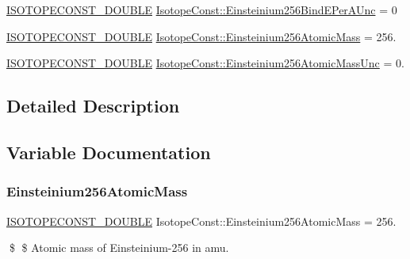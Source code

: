 \begin{DoxyCompactItemize}
\mbox{\hyperlink{group___isotope_const-_macros_ga8f45a7272ce02c0b4c65c44636ed719a}{I\+S\+O\+T\+O\+P\+E\+C\+O\+N\+S\+T\+\_\+\+D\+O\+U\+B\+LE}} \mbox{\hyperlink{group___isotope_const-_einsteinium-_es256_ga9c8a0cc8111fc54d2b53674bae4335a8}{Isotope\+Const\+::\+Einsteinium256\+Bind\+E\+Per\+A\+Unc}} = 0
\item 
\mbox{\hyperlink{group___isotope_const-_macros_ga8f45a7272ce02c0b4c65c44636ed719a}{I\+S\+O\+T\+O\+P\+E\+C\+O\+N\+S\+T\+\_\+\+D\+O\+U\+B\+LE}} \mbox{\hyperlink{group___isotope_const-_einsteinium-_es256_ga25fb31c163e2229a71731f633fc40a29}{Isotope\+Const\+::\+Einsteinium256\+Atomic\+Mass}} = 256.
\item 
\mbox{\hyperlink{group___isotope_const-_macros_ga8f45a7272ce02c0b4c65c44636ed719a}{I\+S\+O\+T\+O\+P\+E\+C\+O\+N\+S\+T\+\_\+\+D\+O\+U\+B\+LE}} \mbox{\hyperlink{group___isotope_const-_einsteinium-_es256_gae48f918cd84db1b4b3609e2a35bcb6b0}{Isotope\+Const\+::\+Einsteinium256\+Atomic\+Mass\+Unc}} = 0.
\end{DoxyCompactItemize}


\subsection{Detailed Description}


\subsection{Variable Documentation}
\mbox{\label{group___isotope_const-_einsteinium-_es256_ga25fb31c163e2229a71731f633fc40a29}} 
\subsubsection{\texorpdfstring{Einsteinium256\+Atomic\+Mass}{Einsteinium256AtomicMass}}
{\footnotesize\ttfamily \mbox{\hyperlink{group___isotope_const-_macros_ga8f45a7272ce02c0b4c65c44636ed719a}{I\+S\+O\+T\+O\+P\+E\+C\+O\+N\+S\+T\+\_\+\+D\+O\+U\+B\+LE}} Isotope\+Const\+::\+Einsteinium256\+Atomic\+Mass = 256.}

\$ \$ Atomic mass of Einsteinium-\/256 in amu. \mbox{\label{group___isotope_const-_einsteinium-_es256_gae48f918cd84db1b4b3609e2a35bcb6b0}} 
